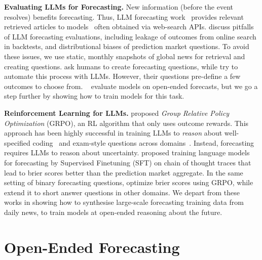 \documentclass{article} %
\begin{document}
 \textbf{Evaluating LLMs for Forecasting.} New information (before the event resolves) benefits forecasting. Thus, LLM forecasting work~\citep{zou2022forecasting, halawi2024approaching} provides relevant retrieved articles to models~\citep{lewis2020retrieval} often obtained via web-search APIs. \citet{paleka2025pitfalls} discuss pitfalls of LLM forecasting evaluations, including leakage of outcomes from online search in backtests, and distributional biases of prediction market questions. To avoid these issues, we use static, monthly snapshots of global news for retrieval and creating questions. \citet{jin-etal-2021-forecastqa} ask humans to create forecasting questions, while \citet{dai2024llms} try to automate this process with LLMs. However, their questions pre-define a few outcomes to choose from. ~\citet{guan2024openep, wang2025openforecast} evaluate models on open-ended forecasts, but we go a step further by showing how to train models for this task. \vspace{0.15cm} 

\textbf{Reinforcement Learning for LLMs.} \citet{shao2024deepseekmath} proposed \textit{Group Relative Policy Optimization} (GRPO), an RL algorithm that only uses outcome rewards. This approach has been highly successful in training LLMs to \textit{reason} about well-specified coding~\citep{jain2024livecodebench} and exam-style questions across domains~\citep{phan2025humanity}. Instead, forecasting requires LLMs to reason about uncertainty. \citet{halawi2024approaching} proposed training language models for forecasting by Supervised Finetuning (SFT) on chain of thought traces that lead to brier scores better than the prediction market aggregate. In the same setting of binary forecasting questions, \citet{turtel2025llms} optimize brier scores using GRPO, while ~\citet{damani2025beyond} extend it to short answer questions in other domains. We depart from these works in showing how to synthesise large-scale forecasting training data from daily news, to train models at open-ended reasoning about the future. 


\section{Open-Ended Forecasting}
\label{sec:open-ended}
\end{document}
